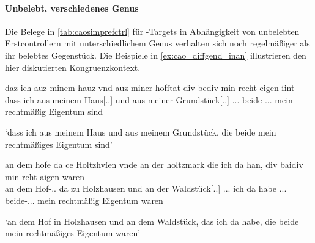 %

\paragraph{Unbelebt, verschiedenes Genus}

Die Belege in \cref{tab:caosimprefctrl} für -Targets in
Abhängigkeit von unbelebten Erstcontrollern mit unterschiedlichem Genus
verhalten sich noch regelmäßiger als ihr belebtes Gegenstück. Die Beispiele in
\cref{ex:cao_diffgend_inan} illustrieren den hier diskutierten
Kongruenzkontext.

\begin{exe}
\ex \label{ex:cao_diffgend_inan}
	\begin{xlist}
	\ex \label{ex:cao_diffgend_inan_1}
		\gll daz ich auz minem hauz vnd auz miner hofſtat
			div bediv min recht eigen ſint \\
			dass ich aus meinem Haus[\Dat.\Sg.\NeutI] und aus meiner
			Grundstück[\Dat.\Sg.\FemI] \Rel.\Nom.\Pl.\NeutI{}
			beide-\Nom.\Pl.\NeutI.\St{} mein rechtmäßig Eigentum sind \\
		\begin{taggedline}{\parencites(Regensburg, 1290)[\pno~1282, 526.37--38]{cao2}}
		\trans `dass ich aus meinem Haus und aus meinem Grundstück, die 
			beide mein rechtmäßiges Eigentum sind'
		\end{taggedline}

	\ex \label{ex:cao_diffgend_inan_2}
		\gll an dem hofe da ce Holtzhvſen \textelp{} vnde an der
			holtzmark die ich da han, div baidiv min
			reht aigen waren \\
			an dem Hof-\Dat.\Sg.\MascI{} da zu Holzhausen {} und an der
			Waldstück[\Dat.\Sg.\FemI] \Rel.\Nom.\Sg.\FemI{} ich da habe
			\Rel.\Nom.\Pl.\NeutI{} beide-\Nom.\Pl.\NeutI.\St{} mein
			rechtmäßig Eigentum waren \\
		\begin{taggedline}{\parencites(Augsburg, 1285)[\pno~N~272, 215.30--31]{cao5}}
		\trans `an dem Hof in Holzhausen \textelp{} und an dem Waldstück,
			das ich da habe, die beide mein rechtmäßiges Eigentum waren'
		\end{taggedline}
	\end{xlist}
\end{exe}

